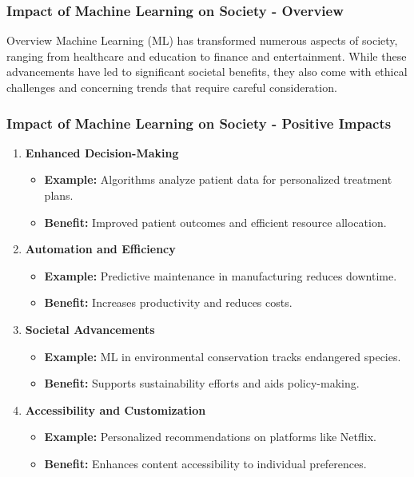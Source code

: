 \documentclass[aspectratio=169]{beamer}
\begin{document}
\begin{frame}[fragile]
    \frametitle{Impact of Machine Learning on Society - Overview}
    \begin{block}{Overview}
        Machine Learning (ML) has transformed numerous aspects of society, ranging from healthcare and education to finance and entertainment. While these advancements have led to significant societal benefits, they also come with ethical challenges and concerning trends that require careful consideration.
    \end{block}
\end{frame}

\begin{frame}[fragile]
    \frametitle{Impact of Machine Learning on Society - Positive Impacts}
    \begin{enumerate}
        \item \textbf{Enhanced Decision-Making}
        \begin{itemize}
            \item \textbf{Example:} Algorithms analyze patient data for personalized treatment plans.
            \item \textbf{Benefit:} Improved patient outcomes and efficient resource allocation.
        \end{itemize}
        
        \item \textbf{Automation and Efficiency}
        \begin{itemize}
            \item \textbf{Example:} Predictive maintenance in manufacturing reduces downtime.
            \item \textbf{Benefit:} Increases productivity and reduces costs.
        \end{itemize}
        
        \item \textbf{Societal Advancements}
        \begin{itemize}
            \item \textbf{Example:} ML in environmental conservation tracks endangered species.
            \item \textbf{Benefit:} Supports sustainability efforts and aids policy-making.
        \end{itemize}
        
        \item \textbf{Accessibility and Customization}
        \begin{itemize}
            \item \textbf{Example:} Personalized recommendations on platforms like Netflix.
            \item \textbf{Benefit:} Enhances content accessibility to individual preferences.
        \end{itemize}
    \end{enumerate}
\end{frame}
\end{document}
